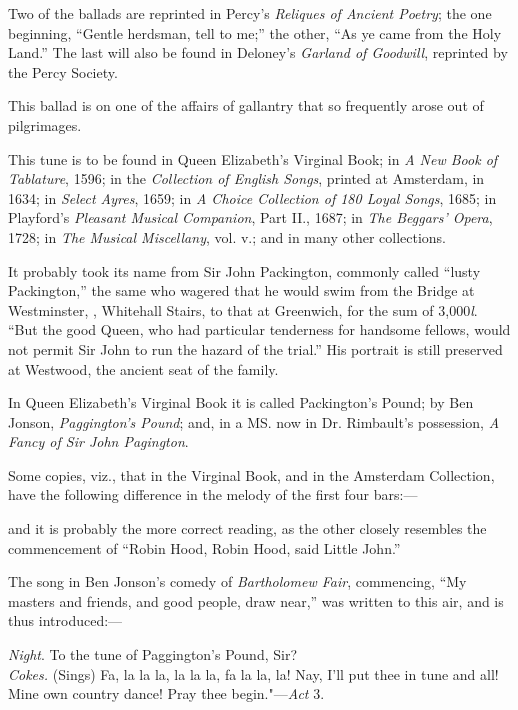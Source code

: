Two of the ballads are reprinted in Percy’s \textit{Reliques of Ancient Poetry}; the
one beginning, “Gentle herdsman, tell \pagebreak to me;” the other, “As ye came from the
Holy Land.” The last will also be found in Deloney’s \textit{Garland of Goodwill},
reprinted by the Percy Society.

\smallskip



This ballad is on one of the affairs of gallantry that so frequently arose out of
pilgrimages.



This tune is to be found in Queen Elizabeth’s Virginal Book; in \textit{A New Book
of Tablature}, 1596; in the \textit{Collection of English Songs}, printed at Amsterdam, in
1634; in \textit{Select Ayres}, 1659; in \textit{A Choice Collection of 180 Loyal Songs}, 1685;
in Playford’s \textit{Pleasant Musical Companion}, Part II., 1687; in \textit{The Beggars’
Opera}, 1728; in \textit{The Musical Miscellany}, vol. v.; and in many other collections.

It probably took its name from Sir John Packington, commonly called “lusty
Packington,” the same who wagered that he would swim from the Bridge at
Westminster, \ie, Whitehall Stairs, to that at Greenwich, for the sum of 3,000\textit{l}.
“But the good Queen, who had particular tenderness for handsome fellows, would
not permit Sir John to run the hazard of the trial.” His portrait is still preserved
at Westwood, the ancient seat of the family.

In Queen Elizabeth’s Virginal Book it is called Packington’s Pound; by Ben
Jonson, \textit{Paggington’s Pound}; and, in a MS. now in Dr. Rimbault’s possession,
\textit{A Fancy of Sir John Pagington}.

Some copies, viz., that in the Virginal Book, and in the Amsterdam Collection,
have the following difference in the melody of the first four bars:—


\noindent and it is probably the more correct reading, as the other closely resembles the
commencement of “Robin Hood, Robin Hood, said Little John.”

The song in Ben Jonson’s comedy of \textit{Bartholomew Fair}, commencing, “My
masters and friends, and good people, draw near,” was written to this air, and is
thus introduced:—
\begin{scverse}
\textit{Night}. To the tune of Paggington's Pound, Sir?\\
\textit{Cokes.} (Sings) Fa, la la la, la la la, fa la la, la! Nay, I’ll put thee in tune and all!\\
\vin\vin\vin Mine own country dance! Pray thee begin."—\textit{Act} 3.
\end{scverse}
\pagebreak

